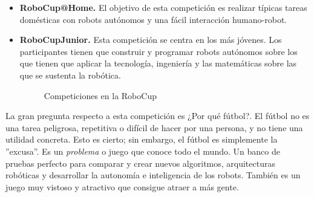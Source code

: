 \begin{itemize}
\item \textbf{RoboCup@Home.} El objetivo de esta competición es realizar típicas tareas domésticas con robots autónomos y una fácil interacción humano-robot.

\item \textbf{RoboCupJunior.} Esta competición se centra en los más jóvenes. Los participantes tienen que construir y programar robots autónomos sobre los que tienen que aplicar la tecnología, ingeniería y las matemáticas sobre las que se sustenta la robótica.

\begin{figure}[h]
  \centering
\caption{Competiciones en la RoboCup}
\end{figure}

\end{itemize}

La gran pregunta respecto a esta competición es ¿Por qué fútbol?. El fútbol no es una tarea peligrosa, repetitiva o difícil de hacer por una persona, y no tiene una utilidad concreta. Esto es cierto; sin embargo, el fútbol es simplemente la ''excusa''. Es un \textit{problema} o juego que conoce todo el mundo. Un banco de pruebas perfecto para comparar y crear nuevos algoritmos, arquitecturas robóticas y desarrollar la autonomía e inteligencia de los robots. También es un juego muy vistoso y atractivo que consigue atraer a más gente.\\

